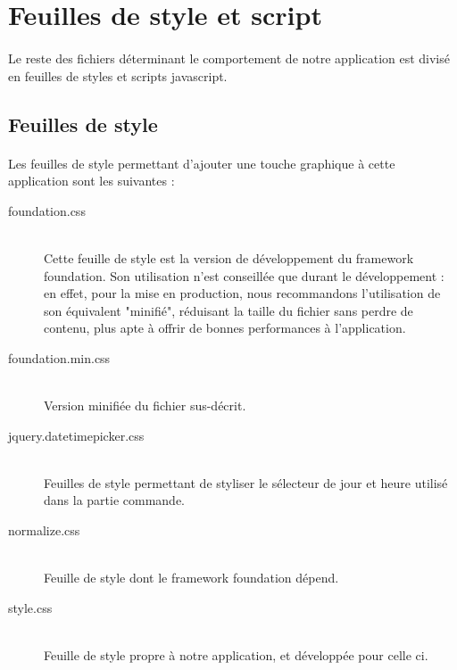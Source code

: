 \section{Feuilles de style et script}
    \paragraph{}
        Le reste des fichiers déterminant le comportement de notre application
        est divisé en feuilles de styles et scripts javascript.
    \subsection{Feuilles de style}
        \paragraph{}
            Les feuilles de style permettant d'ajouter une touche graphique à
            cette application sont les suivantes :
        \begin{description}
            \item[foundation.css]\hfill \\
                Cette feuille de style est la version de développement du
                framework foundation.
                Son utilisation n'est conseillée que durant le développement : 
                en effet, pour la mise en production, nous recommandons
                l'utilisation de son équivalent "minifié", réduisant la taille
                du fichier sans perdre de contenu, plus apte à offrir de bonnes
                performances à l'application.
            \item[foundation.min.css]\hfill \\
                Version minifiée du fichier sus-décrit.
            \item[jquery.datetimepicker.css]\hfill \\
                Feuilles de style permettant de styliser le sélecteur de
                jour et heure utilisé dans la partie commande.
            \item[normalize.css]\hfill \\
                Feuille de style dont le framework foundation dépend.
            \item[style.css]\hfill \\
                Feuille de style propre à notre application, et développée
                pour celle ci.
        \end{description}
